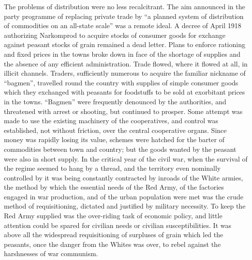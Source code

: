 The problems of distribution were no less recalcitrant. The aim announced in the party programme of replacing private trade by ``a planned system of distribution of commodities on an all-state scale'' was a remote ideal. A decree of April 1918 authorizing Narkomprod to acquire stocks of consumer goods for exchange against peasant stocks of grain remained a dead letter. Plans to enforce rationing and fixed prices in the towns broke down in face of the shortage of supplies and the absence of any efficient administration. Trade flowed, where it flowed at all, in illicit channels. Traders, sufficiently numerous to acquire the familiar nickname of ``bagmen'', travelled round the country with supplies of simple consumer goods which they exchanged with peasants for foodstuffs to be sold at exorbitant prices in the towns. ``Bagmen'' were frequently denounced by the authorities, and threatened with arrest or shooting, but continued to prosper. Some attempt was made to use the existing machinery of the cooperatives, and control was established, not without friction, over the central cooperative organs. Since money was rapidly losing its value, schemes were hatched for the barter of commodities between town and country; but the goods wanted by the peasant were also in short supply. In the critical year of the civil war, when the survival of the regime seemed to hang by a thread, and the territory even nominally controlled by it was being constantly contracted by inroads of the White armies, the method by which the essential needs of the Red Army, of the factories engaged in war production, and of the urban population were met was the crude method of requisitioning, dictated and justified by military necessity. To keep the Red Army supplied was the over-riding task of economic policy, and little attention could be spared for civilian needs or civilian susceptibilities. It was above all the widespread requisitioning of surpluses of grain which led the peasants, once the danger from the Whites was over, to rebel against the harshnesses of war communism. 

